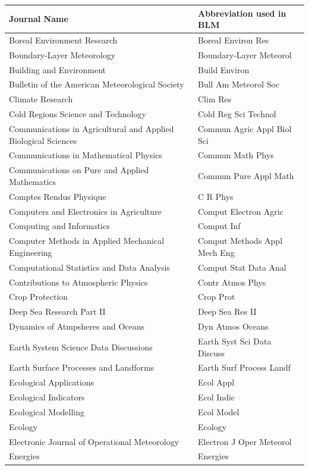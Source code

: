 \begin{longtable}{| p{8 cm} | p{6 cm} |}
\hline
Journal Name & Abbreviation used in BLM \\
\hline
Boreal Environment Research & Boreal Environ Res \\
Boundary-Layer Meteorology & Boundary-Layer Meteorol \\
Building and Environment & Build Environ \\
Bulletin of the American Meteorological Society & Bull Am Meteorol Soc \\
\hline
Climate Research & Clim Res \\
Cold Regions Science and Technology & Cold Reg Sci Technol \\
Communications in Agricultural and Applied Biological Sciences & Commun Agric Appl Biol Sci \\
Communications in Mathematical Physics & Commun Math Phys \\
Communications on Pure and Applied Mathematics & Commun Pure Appl Math \\
Comptes Rendus Physique & C R Phys \\
Computers and Electronics in Agriculture & Comput Electron Agric \\
Computing and Informatics & Comput Inf \\
Computer Methods in Applied Mechanical Engineering & Comput Methods Appl Mech Eng \\
Computational Statistics and Data Analysis & Comput Stat Data Anal \\
Contributions to Atmospheric Physics & Contr Atmos Phys \\
Crop Protection & Crop Prot \\
\hline
Deep Sea Research Part II & Deep Sea Res II \\
Dynamics of Atmpsheres and Oceans & Dyn Atmos Oceans \\
\hline
Earth System Science Data Discussions & Earth Syst Sci Data Discuss \\
Earth Surface Processes and Landforms & Earth Surf Process Landf \\
Ecological Applications & Ecol Appl \\
Ecological Indicators & Ecol Indic \\
Ecological Modelling & Ecol Model \\
Ecology & Ecology \\
Electronic Journal of Operational Meteorology & Electron J Oper Meteorol \\
Energies & Energies \\

\end{longtable}
